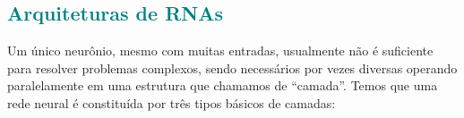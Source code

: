 \documentclass{automatextcc}
\newcommand{\nico}[1]{\textcolor{teal}{#1}}
\begin{document}
\subsection{\nico{Arquiteturas de RNAs}}


Um único neurônio, mesmo com muitas entradas, usualmente não é suficiente para resolver problemas complexos, sendo necessários por vezes diversas operando paralelamente em uma estrutura que chamamos de ``camada''. Temos que uma rede neural é constituída por três tipos básicos de camadas:
\end{document}
